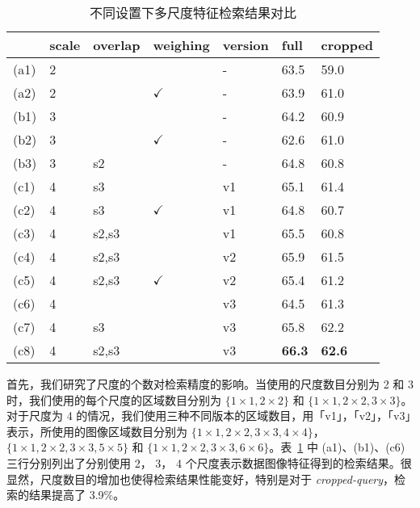 \begin{table}[!t]
	\centering
	\caption{不同设置下多尺度特征检索结果对比}
	\label{table:multiscale_exp_result}
	\begin{tabular}{@{}lllllll@{}}
		\toprule
		&   scale &  overlap   &  weighing  & version &     full    &    cropped    \\
		\midrule
		(a1) &   2   & \texttimes & \texttimes &    -    &     63.5      &     59.0      \\
		(a2) &   2   & \texttimes & $\checkmark$ &    -    &     63.9      &     61.0      \\
		\midrule
		(b1) &   3   & \texttimes & \texttimes &    -    &     64.2      &     60.9      \\
		(b2) &   3   & \texttimes & $\checkmark$ &    -    &     62.6      &     61.0      \\
		(b3) &   3   &     s2     & \texttimes &    -    &     64.8      &     60.8      \\
		\midrule
		(c1) &   4   &     s3     & \texttimes &   v1    &     65.1      &     61.4      \\
		(c2) &   4   &     s3     & $\checkmark$ &   v1    &     64.8      &     60.7      \\
		(c3) &   4   &   s2,s3    & \texttimes &   v1    &     65.5      &     60.8      \\
		(c4) &   4   &   s2,s3    & \texttimes&   v2    &     65.9      &     61.5      \\
		(c5) &   4   &   s2,s3    & $\checkmark$ &   v2    &     65.4      &     61.2      \\
		(c6) &   4   & \texttimes & \texttimes &   v3    &     64.5      &     61.3      \\
		(c7) &   4   &     s3     & \texttimes&   v3    &     65.8      &     62.2      \\
		(c8) &   4   &   s2,s3    & \texttimes&   v3    & \textbf{66.3} & \textbf{62.6} \\
		\bottomrule
	\end{tabular}
\end{table}

首先，我们研究了尺度的个数对检索精度的影响。当使用的尺度数目分别为 2 和 3 时，我们使用的每个尺度的区域数目分别为 $\{1\times1, 2\times2\}$ 和
$\{1\times1, 2\times2, 3\times3\}$。对于尺度为 4 的情况，我们使用三种不同版本的区域数目，用「v1」，「v2」，「v3」表示，所使用的图像区域数目分别为 $\{1\times1, 2\times2, 3\times3, 4\times4\}$，$\{1\times1, 2\times2, 3\times3, 5\times5\}$ 和 $\{1\times1, 2\times2, 3\times3, 6\times6\}$。表~\ref{table:multiscale_exp_result} 中 (a1)、(b1)、(c6) 三行分别列出了分别使用 2， 3， 4 个尺度表示数据图像特征得到的检索结果。很显然，尺度数目的增加也使得检索结果性能变好，特别是对于 \emph{cropped-query}，检索的结果提高了 3.9\%。


